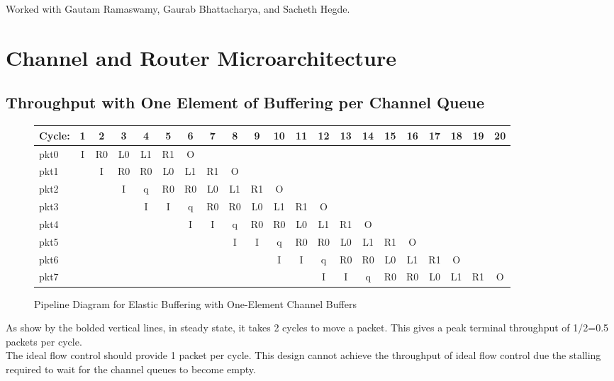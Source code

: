 \documentclass[10pt]{article}
\begin{document}
\cleardoublepage
Worked with Gautam Ramaswamy, Gaurab Bhattacharya, and Sacheth Hegde.
\section{Channel and Router Microarchitecture}

\subsection{Throughput with One Element of Buffering per Channel Queue}

\begin{figure}[H]
\centering
{\setlength{\tabcolsep}{2pt}
\begin{tabular}{|l|c|c|c|c|c|c|c|c|c!{\vrule width 1.5pt}c|c!{\vrule width 1.5pt}c|c!{\vrule width 1.5pt}c|c!{\vrule width 1.5pt}c|c!{\vrule width 1.5pt}c|c!{\vrule width 1.5pt}c|}
\hline
Cycle: & 1  & 2  & 3  & 4  & 5  & 6  & 7  & 8  & 9  & 10 & 11 & 12 & 13 & 14 & 15 & 16 & 17 & 18 & 19 & 20 \\ \hline
pkt0   & I  & R0 & L0 & L1 & R1 & O  &    &    &    &    &    &    &    &    &    &    &    &    &    &    \\ \hline
pkt1   &    & I  & R0 & R0 & L0 & L1 & R1 & O  &    &    &    &    &    &    &    &    &    &    &    &    \\ \hline
pkt2   &    &    & I  & q  & R0 & R0 & L0 & L1 & R1 & O  &    &    &    &    &    &    &    &    &    &    \\ \hline
pkt3   &    &    &    & I  & I  & q  & R0 & R0 & L0 & L1 & R1 & O  &    &    &    &    &    &    &    &    \\ \hline
pkt4   &    &    &    &    &    & I  & I  & q  & R0 & R0 & L0 & L1 & R1 & O  &    &    &    &    &    &    \\ \hline
pkt5   &    &    &    &    &    &    &    & I  & I  & q  & R0 & R0 & L0 & L1 & R1 & O  &    &    &    &    \\ \hline
pkt6   &    &    &    &    &    &    &    &    &    & I  & I  & q  & R0 & R0 & L0 & L1 & R1 & O  &    &    \\ \hline
pkt7   &    &    &    &    &    &    &    &    &    &    &    & I  & I  & q  & R0 & R0 & L0 & L1 & R1 & O  \\ \hline
\end{tabular}
}
\caption{Pipeline Diagram for Elastic Buffering with One-Element Channel Buffers}
\end{figure}
As show by the bolded vertical lines, in steady state, it takes 2 cycles to move a packet. This gives a peak terminal throughput of 1/2=0.5 packets per cycle.\\
The ideal flow control should provide 1 packet per cycle. This design cannot achieve the throughput of ideal flow control due the stalling required to wait for the channel queues to become empty.
\end{document}
